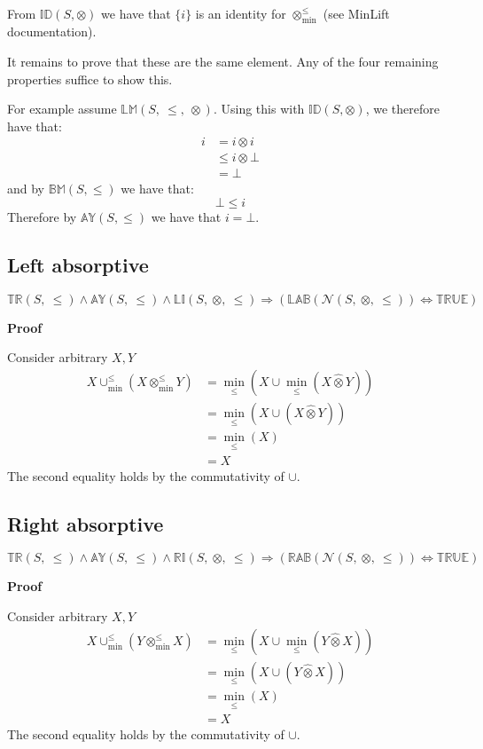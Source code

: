 \documentclass[10pt]{article}
\newcommand{\propname}[1]{{\mathbb{#1}}}
\newcommand{\minlift}{\otimes_{\min}^{\leq}}
\newcommand{\lift}{\hat{\otimes}}
\newcommand{\minunion}{\cup_{\min}^{\leq}}
\newcommand{\proof}{\vspace{1em} \textbf{Proof} \vspace{1em}}
\begin{document}
From $\propname{ID}(S,\otimes)$ we have that $\{ i \}$ is an identity for $\minlift$ (see MinLift documentation).

\vspace{0.5em}

It remains to prove that these are the same element. Any of the four remaining properties suffice to show this. 

\vspace{0.5em}

For example assume $\propname{LM}(S,\ \leq,\ \otimes)$. Using this with $\propname{ID}(S,\otimes)$, we therefore have that:
\begin{align*}
i 	& = i \otimes i \\
  	& \leq i \otimes \bot \\
  	& = \bot
\end{align*} 
and by $\propname{BM}(S,\leq)$ we have that:
\begin{equation*}
\bot \leq i
\end{equation*}
Therefore by $\propname{AY}(S,\leq)$ we have that $i = \bot$.

\subsection{Left absorptive}

$\propname{TR}(S,\ \leq) \wedge \propname{AY}(S,\ \leq) \wedge \propname{LI}(S,\ \otimes,\ \leq) \Rightarrow (\propname{LAB}(\mathcal{N}(S,\ \otimes,\ \leq)) \Leftrightarrow \propname{TRUE})$

\proof

Consider arbitrary $X, Y$
\begin{align*}
X \minunion (X \minlift Y) 	& = \min_\leq(X \cup \min_\leq(X \lift Y)) \\
							& = \min_\leq(X \cup (X \lift Y)) \\
							& = \min_\leq(X) \\
							& = X
\end{align*}
The second equality holds by the commutativity of $\cup$.



\subsection{Right absorptive}

$\propname{TR}(S,\ \leq) \wedge \propname{AY}(S,\ \leq) \wedge \propname{RI}(S,\ \otimes,\ \leq) \Rightarrow (\propname{RAB}(\mathcal{N}(S,\ \otimes,\ \leq)) \Leftrightarrow \propname{TRUE})$

\proof

Consider arbitrary $X, Y$
\begin{align*}
X \minunion (Y \minlift X) 	& = \min_\leq(X \cup \min_\leq(Y \lift X)) \\
							& = \min_\leq(X \cup (Y \lift X)) \\
							& = \min_\leq(X) \\
							& = X	
\end{align*}
The second equality holds by the commutativity of $\cup$.
\end{document}
